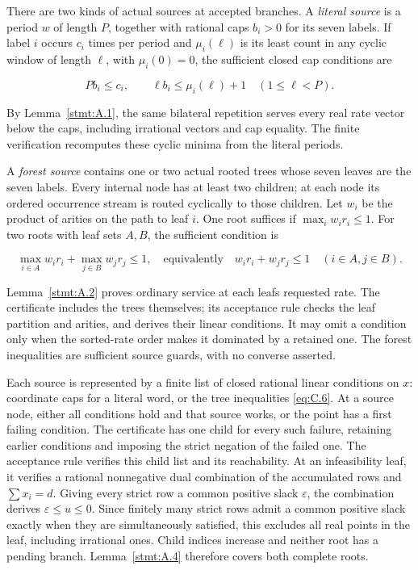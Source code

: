 \documentclass[11pt,a4paper]{article}
\begin{document}
There are two kinds of actual sources at accepted branches. A \emph{literal source} is a period \(w\) of length \(P\), together with rational caps \(b_i>0\) for its seven labels. If label \(i\) occurs \(c_i\) times per period and \(\mu_i(\ell)\) is its least count in any cyclic window of length \(\ell\), with \(\mu_i(0)=0\), the sufficient closed cap conditions are

\begin{equation}
Pb_i\le c_i,\qquad
 \ell b_i\le\mu_i(\ell)+1\quad(1\le\ell<P).
\tag{C.5}\label{eq:C.5}
\end{equation}

By Lemma~\ref{stmt:A.1}, the same bilateral repetition serves every real rate vector below the caps, including irrational vectors and cap equality. The finite verification recomputes these cyclic minima from the literal periods.

A \emph{forest source} contains one or two actual rooted trees whose seven leaves are the seven labels. Every internal node has at least two children; at each node its ordered occurrence stream is routed cyclically to those children. Let \(w_i\) be the product of arities on the path to leaf \(i\). One root suffices if \(\max_i w_i r_i\le1\). For two roots with leaf sets \(A,B\), the sufficient condition is

\begin{equation}
\max_{i\in A}w_i r_i+\max_{j\in B}w_j r_j\le1,
  \quad\text{equivalently}\quad
  w_i r_i+w_jr_j\le1\quad(i\in A,j\in B).
\tag{C.6}\label{eq:C.6}
\end{equation}

Lemma~\ref{stmt:A.2} proves ordinary service at each leaf\textquotesingle s requested rate. The certificate includes the trees themselves; its acceptance rule checks the leaf partition and arities, and derives their linear conditions. It may omit a condition only when the sorted-rate order makes it dominated by a retained one. The forest inequalities are sufficient source guards, with no converse asserted.

Each source is represented by a finite list of closed rational linear conditions on \(x\): coordinate caps for a literal word, or the tree inequalities \eqref{eq:C.6}. At a source node, either all conditions hold and that source works, or the point has a first failing condition. The certificate has one child for every such failure, retaining earlier conditions and imposing the strict negation of the failed one. The acceptance rule verifies this child list and its reachability. At an infeasibility leaf, it verifies a rational nonnegative dual combination of the accumulated rows and \(\sum x_i=d\). Giving every strict row a common positive slack \(\varepsilon\), the combination derives \(\varepsilon\le u\le0\). Since finitely many strict rows admit a common positive slack exactly when they are simultaneously satisfied, this excludes all real points in the leaf, including irrational ones. Child indices increase and neither root has a pending branch. Lemma~\ref{stmt:A.4} therefore covers both complete roots.
\end{document}
